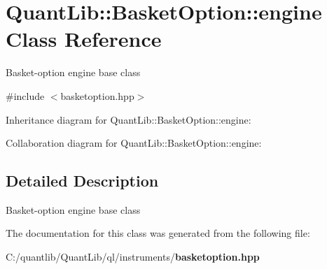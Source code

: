 \section{Quant\+Lib\+:\+:Basket\+Option\+:\+:engine Class Reference}
\label{class_quant_lib_1_1_basket_option_1_1engine}


Basket-\/option engine base class  




{\ttfamily \#include $<$basketoption.\+hpp$>$}



Inheritance diagram for Quant\+Lib\+:\+:Basket\+Option\+:\+:engine\+:


Collaboration diagram for Quant\+Lib\+:\+:Basket\+Option\+:\+:engine\+:


\subsection{Detailed Description}
Basket-\/option engine base class 

The documentation for this class was generated from the following file\+:\begin{DoxyCompactItemize}
\item 
C\+:/quantlib/\+Quant\+Lib/ql/instruments/{\bf basketoption.\+hpp}\end{DoxyCompactItemize}
